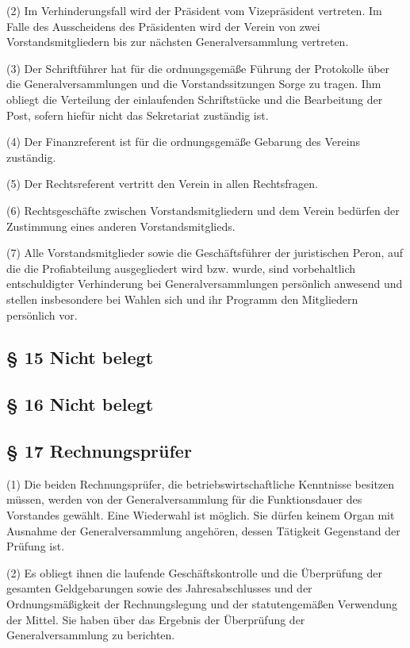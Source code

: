 \documentclass[10pt,a4paper]{article}
\begin{document}
(2)
Im Verhinderungsfall wird der Präsident vom Vizepräsident vertreten.
Im Falle des Ausscheidens des Präsidenten wird der Verein von zwei Vorstandsmitgliedern bis zur nächsten Generalversammlung vertreten.

(3)
Der Schriftführer hat für die ordnungsgemäße Führung der Protokolle über die Generalversammlungen und die Vorstandssitzungen Sorge zu tragen.
Ihm obliegt die Verteilung der einlaufenden Schriftstücke und die Bearbeitung der Post, sofern hiefür nicht das Sekretariat zuständig ist.

(4)
Der Finanzreferent ist für die ordnungsgemäße Gebarung des Vereins zuständig.

(5)
Der Rechtsreferent vertritt den Verein in allen Rechtsfragen.

(6)
Rechtsgeschäfte zwischen Vorstandsmitgliedern und dem Verein bedürfen der Zustimmung eines anderen Vorstandsmitglieds.

(7)
Alle Vorstandsmitglieder sowie die Geschäftsführer der juristischen Peron, auf die die Profiabteilung ausgegliedert wird bzw. wurde, sind vorbehaltlich entschuldigter Verhinderung bei Generalversammlungen persönlich anwesend und stellen insbesondere bei Wahlen sich und ihr Programm den Mitgliedern persönlich vor.

\subsection{§ 15
Nicht belegt}

\subsection{§ 16
Nicht belegt}

\subsection{§ 17
Rechnungsprüfer}

(1)
Die beiden Rechnungsprüfer, die betriebswirtschaftliche Kenntnisse besitzen müssen, werden von der Generalversammlung für die Funktionsdauer des Vorstandes gewählt.
Eine Wiederwahl ist möglich.
Sie dürfen keinem Organ mit Ausnahme der Generalversammlung angehören, dessen Tätigkeit Gegenstand der Prüfung ist.

(2)
Es obliegt ihnen die laufende Geschäftskontrolle und die Überprüfung der gesamten Geldgebarungen sowie des Jahresabschlusses und der Ordnungsmäßigkeit der Rechnungslegung und der statutengemäßen Verwendung der Mittel.
Sie haben über das Ergebnis der Überprüfung der Generalversammlung zu berichten.
\end{document}
